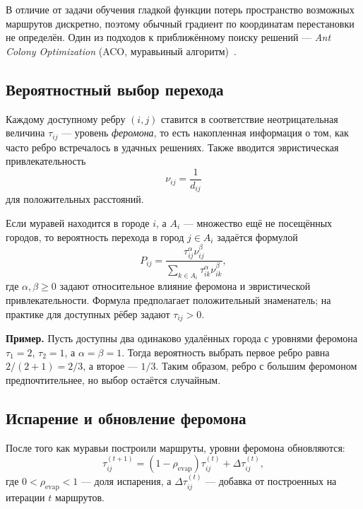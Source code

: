 \documentclass[12pt,a4paper]{article}
\begin{document}
В отличие от задачи обучения гладкой функции потерь
пространство возможных маршрутов дискретно, поэтому
обычный градиент по координатам перестановки
не определён. Один из подходов к приближённому поиску
решений --- \emph{Ant Colony Optimization} (ACO,
муравьиный алгоритм)~\cite{dorigo-stutzle}.

\subsection{Вероятностный выбор перехода}

Каждому доступному ребру $(i,j)$ ставится в соответствие
неотрицательная величина $\tau_{ij}$ --- уровень
\emph{феромона}, то есть накопленная информация о том,
как часто ребро встречалось в удачных решениях.
Также вводится эвристическая привлекательность
\[
    \nu_{ij}=\frac1{d_{ij}}
\]
для положительных расстояний.

Если муравей находится в городе $i$, а $A_i$ ---
множество ещё не посещённых городов, то вероятность
перехода в город $j\in A_i$ задаётся формулой
\begin{equation}
    \boxed{P_{ij}=
       \frac{\tau_{ij}^{\alpha}\nu_{ij}^{\beta}}
       {\displaystyle\sum_{k\in A_i}
          \tau_{ik}^{\alpha}\nu_{ik}^{\beta}}},
    \label{eq:aco-probability}
\end{equation}
где $\alpha,\beta\ge0$ задают относительное влияние
феромона и эвристической привлекательности.
Формула предполагает положительный знаменатель;
на практике для доступных рёбер задают
$\tau_{ij}>0$.

\textbf{Пример.} Пусть доступны два одинаково удалённых города
с уровнями феромона $\tau_1=2$, $\tau_2=1$,
а $\alpha=\beta=1$.
Тогда вероятность выбрать первое ребро равна
$2/(2+1)=2/3$, а второе --- $1/3$.
Таким образом, ребро с большим феромоном предпочтительнее,
но выбор остаётся случайным.

\subsection{Испарение и обновление феромона}

После того как муравьи построили маршруты,
уровни феромона обновляются:
\begin{equation}
    \boxed{\tau_{ij}^{(t+1)}
       =(1-\rho_{\mathrm{evap}})\tau_{ij}^{(t)}
           +\Delta\tau_{ij}^{(t)}},
    \label{eq:aco-pheromone}
\end{equation}
где $0<\rho_{\mathrm{evap}}<1$ --- доля испарения,
а $\Delta\tau_{ij}^{(t)}$ --- добавка от построенных
на итерации $t$ маршрутов.
\end{document}
